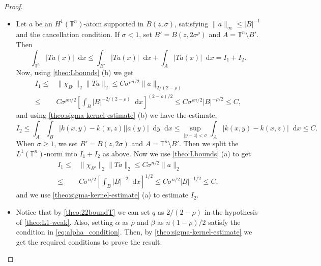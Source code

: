 \documentclass[12pt, reqno]{amsart}
\theoremstyle{definition}
\theoremstyle{remark}
\numberwithin{equation}{section}
\newcommand*\diff{\mathop{}\!\mathrm{d}}
\begin{document}
\begin{proof}
    \begin{itemize}
        \item[(a)] Let $a$ be an $H^1(\mathbb{T}^n)$-atom supported in $B(z, \sigma)$, satisfying $\|a\|_\infty\leq |B|^{-1}$ and the cancellation condition. If $\sigma < 1$, set $B'=B(z, 2\sigma^\rho)$ and $A = \mathbb{T}^n\setminus B'$. Then 
        \begin{equation*}
            \int_{\mathbb{T}^n}|Ta(x)|\diff x \leq \int_{B'}|Ta(x)|\diff x  + \int_{A}|Ta(x)|\diff x = I_1 + I_2.
        \end{equation*}
        Now, using \cref{theo:Lbounds} (b) we get 
        \begin{align*}
            I_1 \leq & \|\chi_{B'}\|_{2}\|Ta\|_{{2}}\leq C\sigma^{\rho n/2}\|a\|_{{2/(2-\rho)}} \\ \leq & C\sigma^{\rho n/2} \left[ \int_B |B|^{-2/(2-\rho)}\diff x\right]^{(2-\rho)/2} 
            \leq  C\sigma^{\rho n/2}|B|^{-\rho/2} \leq C,
        \end{align*}
        and using \cref{theo:sigma-kernel-estimate} (b) we have the estimate,
        \begin{equation*}
            I_2 \leq \int_A\int_B |k(x, y) - k(x, z)||a(y)|\diff y \diff x \leq \sup_{|y-z|<\sigma}\int_A|k(x,y)-k(x, z)|\diff x \leq C.
        \end{equation*}
        When $\sigma \geq 1$, we set $B'=B(z, 2\sigma)$ and $A = \mathbb{T}^n\setminus B'$. Then we split the $L^1(\mathbb{T}^n)$-norm into $I_1 + I_2$ as above. Now we use \cref{theo:Lbounds} (a) to get
        \begin{align*}
            I_1 \leq & \|\chi_{B'}\|_{2}\|Ta\|_{{2}}\leq C\sigma^{ n/2}\|a\|_{{2}} \\ 
            \leq & C\sigma^{ n/2} \left[ \int_B |B|^{-2}\diff x\right]^{1/2}  \leq C\sigma^{n/2}|B|^{-1/2}\leq C,
        \end{align*}
        and we use \cref{theo:sigma-kernel-estimate} (a) to estimate $I_2$.\\

        \item[(b)] Notice that by \cref{theo:22boundT} we can set $q$ as $2/(2-\rho)$ in the hypothesis of \cref{theo:L1-weak}. Also, setting $\alpha$ as $\rho$ and $\beta$ as $n(1-\rho)/2$ satisfy the condition in  \cref{eq:alpha_condition}. Then, by \cref{theo:sigma-kernel-estimate} we get the required conditions  to prove the result.\\


\end{itemize}
\end{proof}
\end{document}
